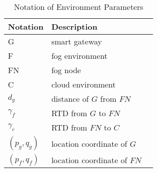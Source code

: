 \begin{table}[!ht]
\centering
\caption{Notation of Environment Parameters}
\begin{tabular}{| l | l | l |}
	\hline
	\bf{Notation} & \bf{Description} \\
	\hline
    G & smart gateway \\
    \hline
    F & fog environment \\
	\hline
    FN & fog node \\
	\hline
    C & cloud environment \\
	\hline 
    $d_g$ & distance of $G$ from $FN$ \\
    \hline    
    ${\gamma}_{f}$ & RTD from $G$ to $FN$ \\
    \hline    
    ${\gamma}_{c}$ & RTD from $FN$ to $C$ \\
    \hline    
    $(p_g, q_g)$ & location coordinate of $G$ \\
    \hline    
    $(p_f, q_f)$ & location coordinate of $FN$ \\
    \hline    
\end{tabular}
\label{tab:environment}
\end{table}